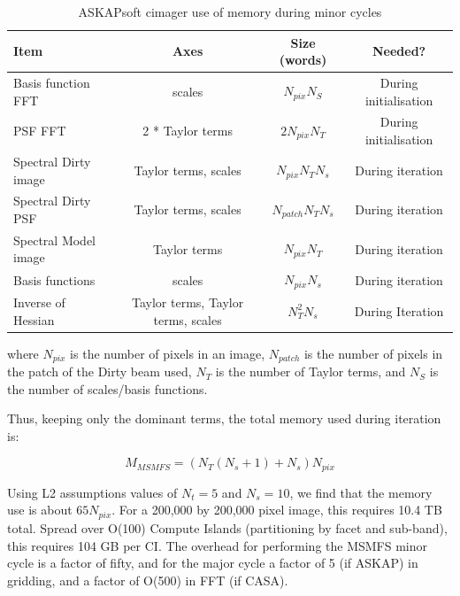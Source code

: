 \documentclass[11pt,a4paper,variablewidth]{article}
\begin{document}
\begin{table}[tbh]
\caption{ASKAPsoft cimager use of memory during minor cycles}\label{tab:askapmemory}

\begin{tabular}{|l|c|c|c|}
\hline
Item & Axes & Size (words) & Needed? \\
\hline
Basis function FFT & scales & $N_{pix} N_S $ & During initialisation \\
PSF FFT & 2 * Taylor terms & $2 N_{pix} N_T $ & During initialisation \\
Spectral Dirty image & Taylor terms, scales & $N_{pix} N_T N_s$ & During iteration \\
Spectral Dirty PSF & Taylor terms, scales & $N_{patch} N_T N_s$ & During iteration \\
Spectral Model image & Taylor terms & $N_{pix} N_T $ & During iteration \\	
Basis functions & scales & $N_{pix} N_s$ & During iteration \\
Inverse of Hessian & Taylor terms, Taylor terms, scales & $N^2_T N_s$ & During Iteration \\
\hline
\end{tabular}	
\end{table}

where $N_{pix}$ is the number of pixels in an image, $N_{patch}$ is the number of pixels in the patch of the Dirty beam used, $N_T$ is the number of Taylor terms, and $N_S$ is the number of scales/basis functions.

Thus, keeping only the dominant terms, the total memory used during iteration is: 

\begin{equation}
M_{MSMFS} = (N_T (N_s + 1) + N_s) N_{pix} 
\end{equation}

Using L2 assumptions values of $N_t=5$ and $N_s=10$, we find that the memory use is about $65 N_{pix}$. For a 200,000 by 200,000 pixel image, this requires 10.4 TB total. Spread over O(100) Compute Islands (partitioning by facet and sub-band), this requires 104 GB per CI. The overhead for performing the MSMFS minor cycle is a factor of fifty, and for the major cycle a factor of 5 (if ASKAP) in gridding, and a factor of O(500) in FFT (if CASA).


%
%
%
%
\end{document}
